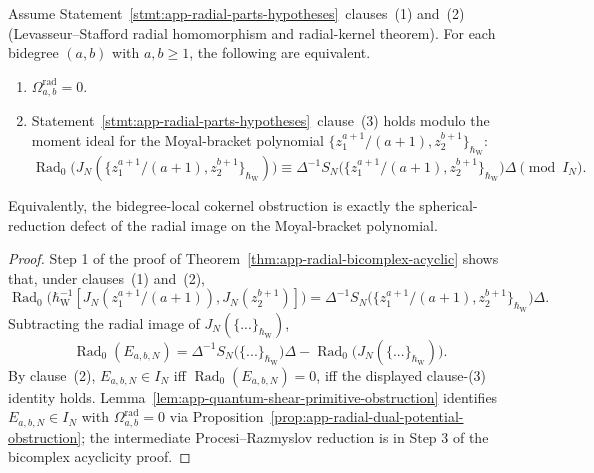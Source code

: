 \begin{cor}
\label{cor:app-radial-bicomplex-clause3-equivalence}
  Assume Statement~\ref{stmt:app-radial-parts-hypotheses}~clauses~(1)
  and~(2) (Levasseur--Stafford radial homomorphism and radial-kernel
  theorem).  For each bidegree \((a,b)\) with \(a,b\geq1\), the
  following are equivalent.
  \begin{enumerate}
    \item \(\Omega^{\mathrm{rad}}_{a,b}=0\).
    \item Statement~\ref{stmt:app-radial-parts-hypotheses}~clause~(3)
      holds modulo the moment ideal for the Moyal-bracket polynomial
      \(\{z_1^{a+1}/(a+1),z_2^{b+1}\}_{\hbar_{\mathrm{W}}}\):
      \[
        \operatorname{Rad}_0\!\bigl(
          J_N(\{z_1^{a+1}/(a+1),z_2^{b+1}\}_{\hbar_{\mathrm{W}}})
        \bigr)
        \equiv
        \Delta^{-1}S_N\!\bigl(
          \{z_1^{a+1}/(a+1),z_2^{b+1}\}_{\hbar_{\mathrm{W}}}
        \bigr)\Delta
        \pmod{I_N}.
      \]
  \end{enumerate}
  Equivalently, the bidegree-local cokernel obstruction is exactly
  the spherical-reduction defect of the radial image on the
  Moyal-bracket polynomial.
\end{cor}

\begin{proof}
  Step 1 of the proof of
  Theorem~\ref{thm:app-radial-bicomplex-acyclic} shows that, under
  clauses~(1) and~(2),
  \[
    \operatorname{Rad}_0\!\bigl(
      \hbar_{\mathrm{W}}^{-1}[J_N(z_1^{a+1}/(a+1)),J_N(z_2^{b+1})]
    \bigr)
    =
    \Delta^{-1}S_N\!\bigl(
      \{z_1^{a+1}/(a+1),z_2^{b+1}\}_{\hbar_{\mathrm{W}}}
    \bigr)\Delta .
  \]
  Subtracting the radial image of \(J_N(\{...\}_{\hbar_{\mathrm{W}}})\),
  \[
    \operatorname{Rad}_0(E_{a,b,N})
    =
    \Delta^{-1}S_N\!\bigl(
      \{...\}_{\hbar_{\mathrm{W}}}
    \bigr)\Delta
    -
    \operatorname{Rad}_0\!\bigl(J_N(\{...\}_{\hbar_{\mathrm{W}}})\bigr) .
  \]
  By clause~(2), \(E_{a,b,N}\in I_N\) iff
  \(\operatorname{Rad}_0(E_{a,b,N})=0\), iff the displayed clause-(3)
  identity holds.  Lemma~\ref{lem:app-quantum-shear-primitive-obstruction}
  identifies \(E_{a,b,N}\in I_N\) with
  \(\Omega^{\mathrm{rad}}_{a,b}=0\) via
  Proposition~\ref{prop:app-radial-dual-potential-obstruction}; the
  intermediate Procesi--Razmyslov reduction is in Step 3 of the
  bicomplex acyclicity proof.
\end{proof}

